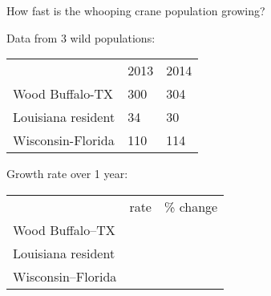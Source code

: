 \begin{frame}[t]
    \begin{adjustwidth}{-2em}{-1.5em}
        How fast is the whooping crane population growing?

        \vspace{2mm}
        Data from 3 wild populations:

        \begin{table}%
            \centering
            \begin{tabular}{ L{4.7cm} C{2cm} C{2cm} }
                & 2013 & 2014 \\
                Wood Buffalo-TX & 300 & 304 \\
                Louisiana resident & 34 & 30 \\
                Wisconsin-Florida & 110 & 114 \\
            \end{tabular}
        \end{table}

        \vspace{3mm}
        Growth rate over 1 year:

        \begin{table}%
            \centering
            \begin{tabular}{ L{4.7cm} C{2cm} C{2cm} }
                & rate & \% change \\
                Wood Buffalo--TX &
                 &
                 \\[3ex]
                Louisiana resident &
                 &
                 \\[3ex]
                Wisconsin--Florida &
                 &
                 \\
            \end{tabular}
        \end{table}
    \end{adjustwidth}
\end{frame}

